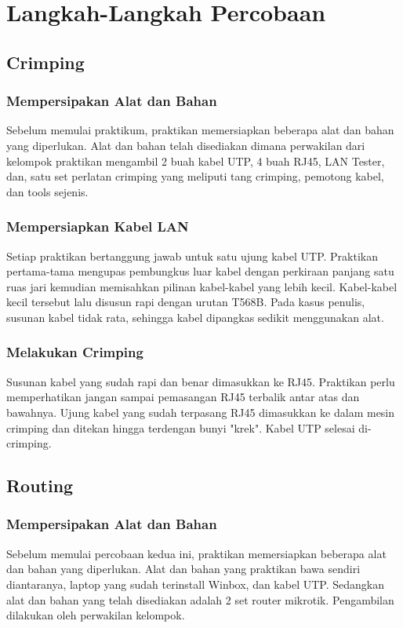 \section{Langkah-Langkah Percobaan}
\subsection{Crimping}
\subsubsection{Mempersipakan Alat dan Bahan}
Sebelum memulai praktikum, praktikan memersiapkan beberapa alat dan bahan yang diperlukan. Alat dan bahan telah disediakan dimana perwakilan dari kelompok praktikan mengambil 2 buah kabel UTP, 4 buah RJ45, LAN Tester, dan, satu set perlatan crimping yang  meliputi tang crimping, pemotong kabel, dan tools sejenis. 

\subsubsection{Mempersiapkan Kabel LAN}
Setiap praktikan bertanggung jawab untuk satu ujung kabel UTP. Praktikan pertama-tama mengupas pembungkus luar kabel dengan perkiraan panjang satu ruas jari kemudian memisahkan pilinan kabel-kabel yang lebih kecil. Kabel-kabel kecil tersebut lalu disusun rapi dengan urutan T568B. Pada kasus penulis, susunan kabel tidak rata, sehingga kabel dipangkas sedikit menggunakan alat. 

\subsubsection{Melakukan Crimping}
Susunan kabel yang sudah rapi dan benar dimasukkan ke RJ45. Praktikan perlu memperhatikan jangan sampai pemasangan RJ45 terbalik antar atas dan bawahnya. Ujung kabel yang sudah terpasang RJ45 dimasukkan ke dalam mesin crimping dan ditekan hingga terdengan bunyi "krek". Kabel UTP selesai di-crimping.

\subsection{Routing}
\subsubsection{Mempersipakan Alat dan Bahan}
Sebelum memulai percobaan kedua ini, praktikan memersiapkan beberapa alat dan bahan yang diperlukan. Alat dan bahan yang praktikan bawa sendiri diantaranya, laptop yang sudah terinstall Winbox, dan kabel UTP. Sedangkan alat dan bahan yang telah disediakan adalah 2 set router mikrotik. Pengambilan dilakukan oleh perwakilan kelompok.

